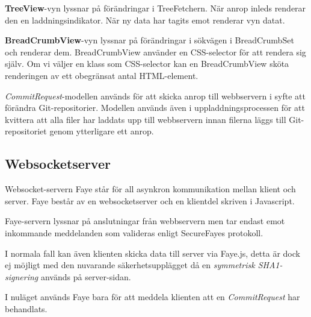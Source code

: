 {\bf TreeView}-vyn lyssnar på förändringar i TreeFetchern. När anrop inleds renderar den en laddningsindikator. När ny data har tagits emot renderar vyn datat.

{\bf BreadCrumbView}-vyn lyssnar på förändringar i sökvägen i BreadCrumbSet och renderar dem. BreadCrumbView använder en CSS-selector för att rendera sig själv. Om vi väljer en klass som CSS-selector kan en BreadCrumbView sköta renderingen av ett obegränsat antal HTML-element.

\emph{CommitRequest}-modellen används för att skicka anrop till webbservern i syfte att förändra Git-repositorier. Modellen används även i uppladdningsprocessen för att kvittera att alla filer har laddats upp till webbservern innan filerna läggs till Git-repositoriet genom ytterligare ett anrop.

\subsection{Websocketserver}
Websocket-servern Faye står för all asynkron kommunikation mellan klient och server. Faye består av en websocketserver och en klientdel skriven i Javascript.

Faye-servern lyssnar på anslutningar från webbservern men tar endast emot inkommande meddelanden som valideras enligt SecureFayes protokoll.

I normala fall kan även klienten skicka data till server via Faye.js, detta är dock ej möjligt med den nuvarande säkerhetsupplägget då en \emph{symmetrisk SHA1-signering} används på server-sidan.

I nuläget används Faye bara för att meddela klienten att en \emph{CommitRequest} har behandlats.

